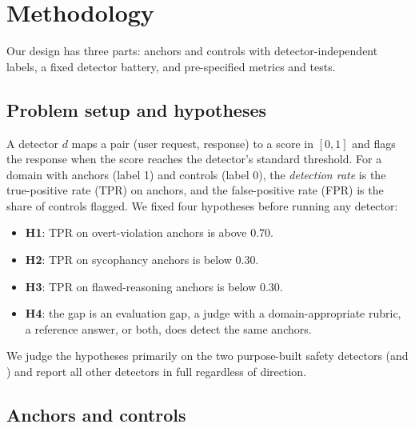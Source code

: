 \section{Methodology}
\label{sec:method}

Our design has three parts: anchors and controls with detector-independent labels, a fixed detector battery, and pre-specified metrics and tests.

\subsection{Problem setup and hypotheses}
\label{sec:hypotheses}

A detector $d$ maps a pair (user request, response) to a score in $[0,1]$ and flags the response when the score reaches the detector's standard threshold.
For a domain with anchors (label 1) and controls (label 0), the \emph{detection rate} is the true-positive rate (TPR) on anchors, and the false-positive rate (FPR) is the share of controls flagged.
We fixed four hypotheses before running any detector:
\begin{itemize}[leftmargin=*,itemsep=0pt,topsep=0pt]
    \item \textbf{H1}: TPR on overt-violation anchors is above 0.70.
    \item \textbf{H2}: TPR on sycophancy anchors is below 0.30.
    \item \textbf{H3}: TPR on flawed-reasoning anchors is below 0.30.
    \item \textbf{H4}: the gap is an evaluation gap, \ie a judge with a domain-appropriate rubric, a reference answer, or both, does detect the same anchors.
\end{itemize}
We judge the hypotheses primarily on the two purpose-built safety detectors (\granite and \harmjudge) and report all other detectors in full regardless of direction.

\subsection{Anchors and controls}
\label{sec:anchors}

